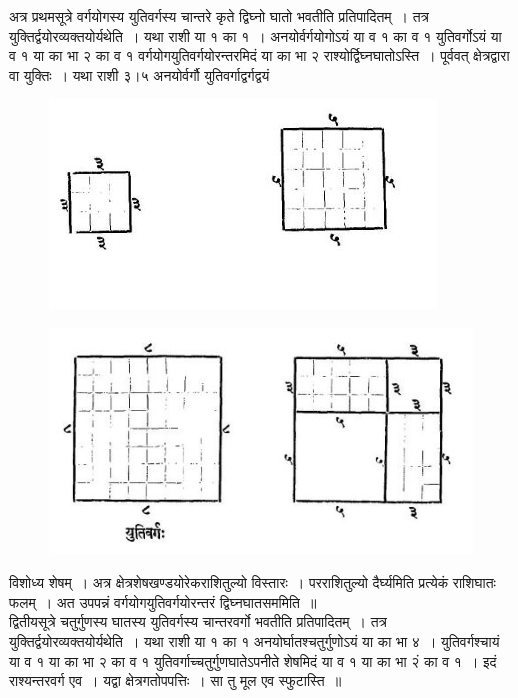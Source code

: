 \documentclass[11pt, openany]{book}
\begin{document}
अत्र प्रथमसूत्रे वर्गयोगस्य युतिवर्गस्य चान्तरे कृते द्विघ्नो घातो भवतीति
प्रतिपादितम्~। तत्र युक्तिर्द्वयोरव्यक्तयोर्यथेति~। यथा राशी या १ का १~। 
अनयोर्वर्गयोगोऽयं या व १ का व १ युतिवर्गोऽयं या व १ या का भा २ 
का व १ वर्गयोगयुतिवर्गयोरन्तरमिदं या का भा २ राश्योर्द्विघ्नघातोऽस्ति~। 
पूर्ववत् क्षेत्रद्वारा वा युक्तिः~। यथा राशी ३।५ अनयोर्वर्गौ युतिवर्गाद्वर्गद्वयं 
\begin{figure}[h!]
    \centering
    \includegraphics[scale=0.8]{Graphics/Capture10.JPG}
\end{figure}
\newpage
\begin{figure}[h!]
    \centering
    \includegraphics[scale=0.8]{Graphics/Capture11.JPG}
\end{figure}

\noindent विशोध्य शेषम्~। अत्र क्षेत्रशेषखण्डयोरेकराशितुल्यो विस्तारः~। परराशितुल्यो दैर्घ्यमिति प्रत्येकं राशिघातः फलम्~। अत उपपन्नं वर्गयोगयुतिवर्गयोरन्तरं द्विघ्नघातसममिति~॥ \\

\vspace{-3mm}
 द्वितीयसूत्रे चतुर्गुणस्य घातस्य युतिवर्गस्य चान्तरवर्गो भवतीति 
प्रतिपादितम्~। तत्र युक्तिर्द्वयोरव्यक्तयोर्यथेति~। यथा राशी या १ का १ 
अनयोर्घातश्चतुर्गुणोऽयं या का भा ४~। युतिवर्गश्चायं या व १ या का भा २ 
का व १ युतिवर्गाच्चतुर्गुणघातेऽपनीते शेषमिदं या व १ या का भा २ं 
का व १~। इदं राश्यन्तरवर्ग एव~। यद्वा क्षेत्रगतोपपत्तिः~। सा तु मूल 
एव स्फुटास्ति~॥ \\
\end{document}
